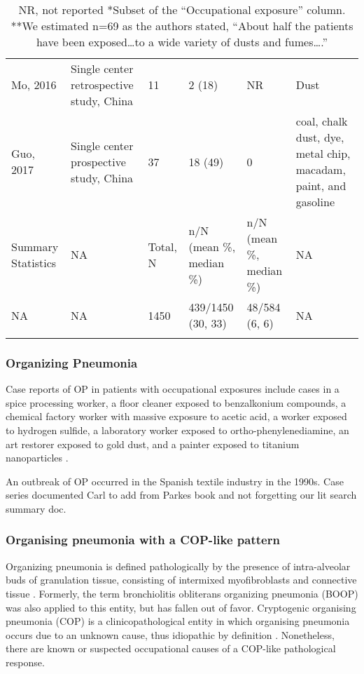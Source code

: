 \documentclass[a4
er,12pt]{article}
\begin{document}
\begin{longtable}{p{2cm}p{3cm}p{1.5cm}p{1.5cm}p{1.5cm}p{4cm}}
 Mo, 2016 &  Single center retrospective study, China &  11 &  2 (18) &  NR &  Dust \\
 Guo, 2017 &  Single center prospective study, China &  37 &  18 (49) &  0 &  coal, chalk dust, dye, metal chip, macadam, paint, and gasoline \\
 Summary Statistics &  NA &  Total, N &  n/N (mean \%, median \%) &  n/N (mean \%, median \%) &  NA \\
 NA &  NA &  1450 &  439/1450 (30, 33) &  48/584 (6, 6) &  NA \\
    \caption*{NR, not reported
    *Subset of the “Occupational exposure” column.
    **We estimated n=69 as the authors stated, “About half the patients have been exposed…to a wide variety of dusts and fumes….”
    }\\
 \end{longtable}

\subsubsection{Organizing Pneumonia}

Case reports of OP in patients with occupational exposures include cases in a spice processing worker, a floor cleaner exposed to benzalkonium compounds, a chemical factory worker with massive exposure to acetic acid, a worker exposed to hydrogen sulfide, a laboratory worker exposed to ortho-phenylenediamine, an art restorer exposed to gold dust, and a painter exposed to titanium nanoparticles \cite{Alleman2002}\cite{Stefano2003}\cite{Sheu2008}\cite{Doujaiji2010}\cite{Sanchez-Ortiz2011}\cite{Ribeiro2011}\cite{Cheng2012}.

An outbreak of OP occurred in the Spanish textile industry in the 1990s.  Case series documented 
Carl to add from Parkes book and not forgetting our lit search summary doc.

\subsubsection{Organising pneumonia with a COP-like pattern}
Organizing pneumonia is defined pathologically by the presence of intra-alveolar buds of granulation tissue, consisting of intermixed myofibroblasts and connective tissue \cite{Cordier2000}. Formerly, the term bronchiolitis obliterans organizing pneumonia (BOOP) was also applied to this entity, but has fallen out of favor. Cryptogenic organising pneumonia (COP) is a clinicopathological entity in which organising pneumonia occurs due to an unknown cause, thus idiopathic by definition \cite{Bradley2008}. Nonetheless, there are known or suspected occupational causes of a COP-like pathological response.
\end{document}
